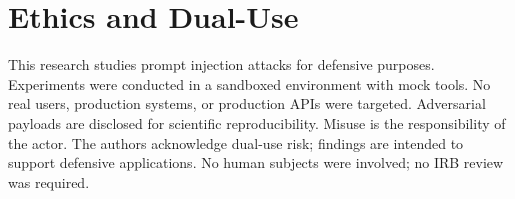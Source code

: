 \documentclass[conference]{IEEEtran}
\begin{document}
\section{Ethics and Dual-Use}
\label{sec:ethics}

This research studies prompt injection attacks for defensive purposes. Experiments were conducted in a sandboxed environment with mock tools. No real users, production systems, or production APIs were targeted. Adversarial payloads are disclosed for scientific reproducibility. Misuse is the responsibility of the actor. The authors acknowledge dual-use risk; findings are intended to support defensive applications. No human subjects were involved; no IRB review was required.

\nocite{*}
\end{document}
